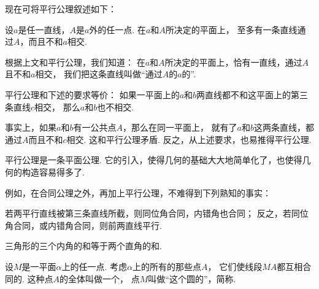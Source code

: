 现在可将平行公理叙述如下：
\begin{axiom}\label{axiom:欧氏几何.平行公理}
设\(a\)是任一直线，\(A\)是\(a\)外的任一点.
在\(a\)和\(A\)所决定的平面上，
至多有一条直线通过\(A\)，而且不和\(a\)相交.
\end{axiom}

根据上文和平行公理，我们知道：
在\(a\)和\(A\)所决定的平面上，恰有一直线，通过\(A\)且不和\(a\)相交，
我们把这条直线叫做“通过\(A\)的\(a\)的”.

平行公理和下述的要求等价：
如果一平面上的\(a\)和\(b\)两直线都不和这平面上的第三条直线\(c\)相交，
那么\(a\)和\(b\)也不相交.

事实上，如果\(a\)和\(b\)有一公共点\(A\)，那么在同一平面上，
就有了\(a\)和\(b\)这两条直线，都通过\(A\)而且不和\(c\)相交.
这和平行公理矛盾.
反之，从上述要求，也易推得平行公理.

平行公理是一条平面公理.
它的引入，使得几何的基础大大地简单化了，也使得几何的构造容易得多了.

例如，在合同公理之外，再加上平行公理，不难得到下列熟知的事实：
\begin{theorem}\label{theorem:欧氏几何.定理30}
若两平行直线被第三条直线所截，则同位角合同，内错角也合同；
反之，若同位角合同，或内错角合同，则前两直线平行.
\end{theorem}

\begin{theorem}\label{theorem:欧氏几何.定理31}
三角形的三个内角的和等于两个直角的和.
\end{theorem}
\begin{figure}[ht]
	\centering
	\caption{}
	\label{figure:欧氏几何.三角形内角和等于平角}
\end{figure}

\begin{definition}
设\(M\)是一平面\(\alpha\)上的任一点.
考虑\(\alpha\)上的所有的那些点\(A\)，
它们使线段\(MA\)都互相合同的.
这种点\(A\)的全体叫做一个，
点\(M\)叫做“这个圆的”，简称.
\end{definition}

